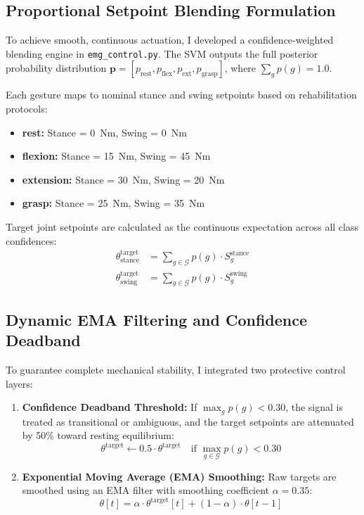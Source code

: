 \documentclass[11pt,a4paper]{article}
\begin{document}
\subsection{Proportional Setpoint Blending Formulation}
To achieve smooth, continuous actuation, I developed a confidence-weighted blending engine in \texttt{emg\_control.py}. The SVM outputs the full posterior probability distribution $\mathbf{p} = [p_{\text{rest}}, p_{\text{flex}}, p_{\text{ext}}, p_{\text{grasp}}]$, where $\sum_{g} p(g) = 1.0$.

Each gesture maps to nominal stance and swing setpoints based on rehabilitation protocols:
\begin{itemize}
    \item \textbf{rest:} Stance = 0~Nm, Swing = 0~Nm
    \item \textbf{flexion:} Stance = 15~Nm, Swing = 45~Nm
    \item \textbf{extension:} Stance = 30~Nm, Swing = 20~Nm
    \item \textbf{grasp:} Stance = 25~Nm, Swing = 35~Nm
\end{itemize}

Target joint setpoints are calculated as the continuous expectation across all class confidences:
\begin{align}
    \theta^{\text{target}}_{\text{stance}} &= \sum_{g \in \mathcal{G}} p(g) \cdot S_g^{\text{stance}} \\
    \theta^{\text{target}}_{\text{swing}}  &= \sum_{g \in \mathcal{G}} p(g) \cdot S_g^{\text{swing}}
\end{align}

\subsection{Dynamic EMA Filtering and Confidence Deadband}
To guarantee complete mechanical stability, I integrated two protective control layers:
\begin{enumerate}
    \item \textbf{Confidence Deadband Threshold:} If $\max_{g} p(g) < 0.30$, the signal is treated as transitional or ambiguous, and the target setpoints are attenuated by 50\% toward resting equilibrium:
    \begin{equation}
        \theta^{\text{target}} \gets 0.5 \cdot \theta^{\text{target}} \quad \text{if } \max_{g \in \mathcal{G}} p(g) < 0.30
    \end{equation}
    \item \textbf{Exponential Moving Average (EMA) Smoothing:} Raw targets are smoothed using an EMA filter with smoothing coefficient $\alpha = 0.35$:
    \begin{equation}
        \theta[t] = \alpha \cdot \theta^{\text{target}}[t] + (1 - \alpha) \cdot \theta[t-1]
    \end{equation}
\end{enumerate}
\end{document}
